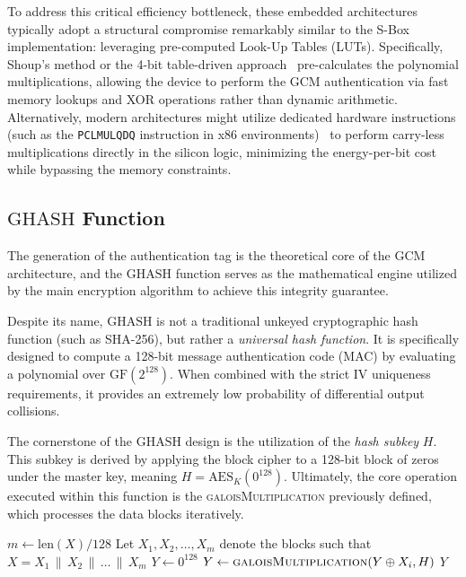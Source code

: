 \documentclass[11pt,a4paper]{report}
\begin{document}
To address this critical efficiency bottleneck, these embedded architectures typically adopt a structural compromise remarkably similar to the S-Box implementation: leveraging pre-computed Look-Up Tables (LUTs). 
Specifically, Shoup's method or the 4-bit table-driven approach~\cite{Shoup} pre-calculates the polynomial multiplications, allowing the device to perform the GCM authentication via fast memory lookups and XOR operations rather than dynamic arithmetic. 
Alternatively, modern architectures might utilize dedicated hardware instructions (such as the \texttt{PCLMULQDQ} instruction in x86 environments)~\cite{PCLMULQDQ} to perform carry-less multiplications directly in the silicon logic, minimizing the energy-per-bit cost while bypassing the memory constraints.


\subsection{\texorpdfstring{$\text{GHASH}$}{GHASH} Function}
The generation of the authentication tag is the theoretical core of the GCM architecture, and the $\text{GHASH}$ function serves as the mathematical engine utilized by the main encryption algorithm to achieve this integrity guarantee.

Despite its name, $\text{GHASH}$ is not a traditional unkeyed cryptographic hash function (such as SHA-256), but rather a \textit{universal hash function}. 
It is specifically designed to compute a 128-bit message authentication code (MAC) by evaluating a polynomial over $\mathrm{GF}(2^{128})$. 
When combined with the strict IV uniqueness requirements, it provides an extremely low probability of differential output collisions. 

The cornerstone of the $\text{GHASH}$ design is the utilization of the \textit{hash subkey} $H$. 
This subkey is derived by applying the block cipher to a 128-bit block of zeros under the master key, meaning $H = \text{AES}_K(0^{128})$. 
Ultimately, the core operation executed within this function is the \textsc{galoisMultiplication} previously defined, which processes the data blocks iteratively.

\begin{algorithm}[htbp]
\caption{$\text{GHASH}_H$ Function}
\label{alg:ghash}
\begin{algorithmic}[1]
    \State $m \gets \text{len}(X) / 128$
    \State Let $X_1, X_2, \dots, X_m$ denote the blocks such that $X = X_1 \,\|\, X_2 \,\|\, \dots \,\|\, X_m$
    \State $Y \gets 0^{128}$
        \State $Y \gets \textsc{galoisMultiplication}(Y \oplus X_i, H)$ 
    \EndFor
    \State \Return $Y$
\EndProcedure
\end{algorithmic}
\end{algorithm}
\end{document}
